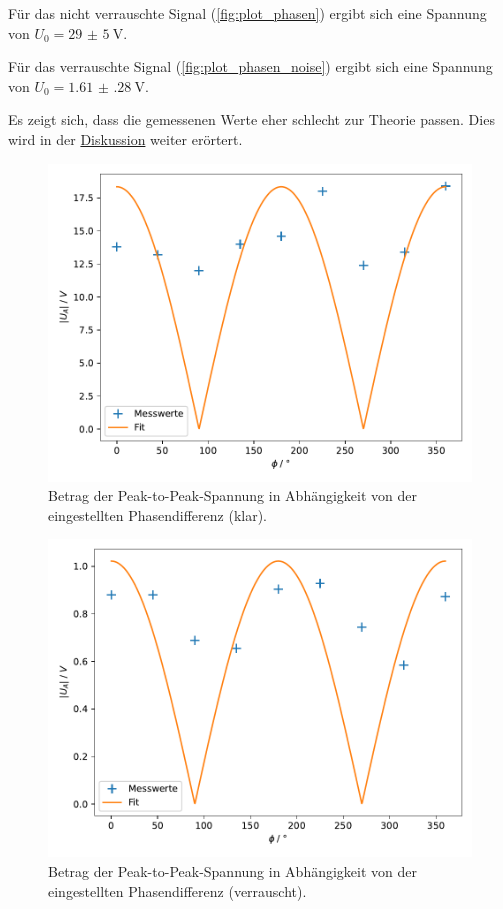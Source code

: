 Für das nicht verrauschte Signal (\autoref{fig:plot_phasen})
ergibt sich eine Spannung von $U_0 = \SI{29(5)}{\volt}$.

Für das verrauschte Signal (\autoref{fig:plot_phasen_noise})
ergibt sich eine Spannung von $U_0 = \SI{1.61(28)}{\volt}$.

Es zeigt sich,
dass die gemessenen Werte eher schlecht zur Theorie passen.
Dies wird in der \hyperref[sec:diskussion]{Diskussion} weiter erörtert.

\begin{figure}
    \centering
    \includegraphics[width=\textwidth]{build/plt/phasen.pdf}
    \caption{Betrag der Peak-to-Peak-Spannung in Abhängigkeit von der eingestellten Phasendifferenz (klar).}
    \label{fig:plot_phasen}
\end{figure}

\begin{figure}
    \centering
    \includegraphics[width=\textwidth]{build/plt/phasen_noise.pdf}
    \caption{Betrag der Peak-to-Peak-Spannung in Abhängigkeit von der eingestellten Phasendifferenz (verrauscht).}
    \label{fig:plot_phasen_noise}
\end{figure}

